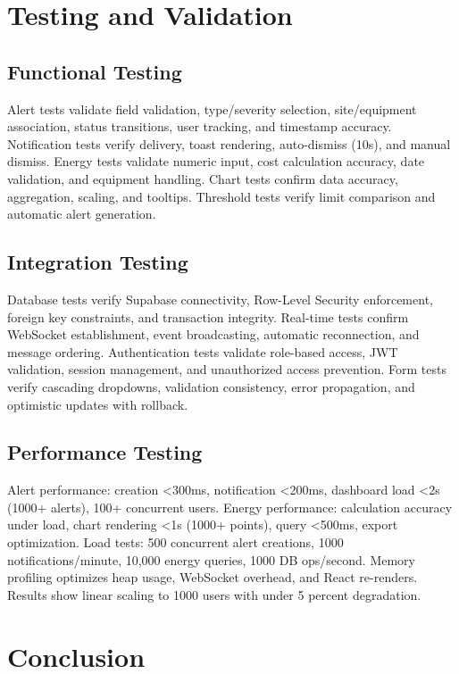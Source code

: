 \section{Testing and Validation}

\subsection{Functional Testing}

Alert tests validate field validation, type/severity selection, site/equipment association, status transitions, user tracking, and timestamp accuracy. Notification tests verify delivery, toast rendering, auto-dismiss (10s), and manual dismiss. Energy tests validate numeric input, cost calculation accuracy, date validation, and equipment handling. Chart tests confirm data accuracy, aggregation, scaling, and tooltips. Threshold tests verify limit comparison and automatic alert generation.

\subsection{Integration Testing}

Database tests verify Supabase connectivity, Row-Level Security enforcement, foreign key constraints, and transaction integrity. Real-time tests confirm WebSocket establishment, event broadcasting, automatic reconnection, and message ordering. Authentication tests validate role-based access, JWT validation, session management, and unauthorized access prevention. Form tests verify cascading dropdowns, validation consistency, error propagation, and optimistic updates with rollback.

\subsection{Performance Testing}

Alert performance: creation <300ms, notification <200ms, dashboard load <2s (1000+ alerts), 100+ concurrent users. Energy performance: calculation accuracy under load, chart rendering <1s (1000+ points), query <500ms, export optimization. Load tests: 500 concurrent alert creations, 1000 notifications/minute, 10,000 energy queries, 1000 DB ops/second. Memory profiling optimizes heap usage, WebSocket overhead, and React re-renders. Results show linear scaling to 1000 users with under 5 percent degradation.

\section{Conclusion}

